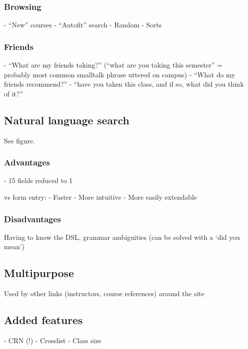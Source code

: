   \subsubsection{Browsing}

  - ``New'' courses
  - ``Autofit'' search
  - Random
  - Sorts

  \subsubsection{Friends}

  - ``What are my friends taking?'' (``what are you taking this semester'' = probably most common smalltalk phrase uttered on campus)
  - ``What do my friends recommend?'' - ``have you taken this class, and if so, what did you think of it?''

\subsection{Natural language search}


See figure.

  \subsubsection{Advantages}

  - 15 fields reduced to 1

  vs form entry:
  - Faster
  - More intuitive
  - More easily extendable

  \subsubsection{Disadvantages}

  Having to know the DSL, grammar ambiguities (can be solved with a `did you mean')

\subsection{Multipurpose}

Used by other links (instructors, course references) around the site

\subsection{Added features}

- CRN (!)
- Crosslist
- Class size



